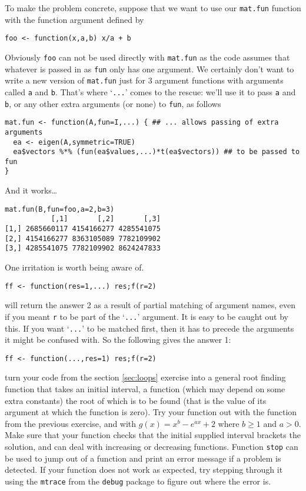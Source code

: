 \documentclass[10pt] {article}
\theoremstyle{definition}
\begin{document}
To make the problem concrete, suppose that we want to use our \lstinline$mat.fun$ function with the function argument defined by 
\begin{lstlisting}
foo <- function(x,a,b) x/a + b
\end{lstlisting}
Obviously {\tt foo} can not be used directly with \lstinline$mat.fun$ as the code assumes that whatever is passed in as {\tt fun} only has one argument. We certainly don't want to write a new version of \lstinline$mat.fun$ just for 3 argument functions with arguments called {\tt a} and {\tt b}. That's where `\lstinline$...$' comes to the rescue: we'll use it to pass {\tt a} and {\tt b}, or any other extra arguments (or none) to {\tt fun}, as follows
\begin{lstlisting}
mat.fun <- function(A,fun=I,...) { ## ... allows passing of extra arguments
  ea <- eigen(A,symmetric=TRUE)
  ea$vectors %*% (fun(ea$values,...)*t(ea$vectors)) ## to be passed to fun
}
\end{lstlisting}
And it works\ldots
\begin{lstlisting}
mat.fun(B,fun=foo,a=2,b=3)
           [,1]       [,2]       [,3]
[1,] 2685660117 4154166277 4285541075
[2,] 4154166277 8363105089 7782109902
[3,] 4285541075 7782109902 8624247833
\end{lstlisting}

One irritation is worth being aware of. 
\begin{lstlisting}
ff <- function(res=1,...) res;f(r=2)
\end{lstlisting}
will return the answer 2 as a result of partial matching of argument names, even if you meant \lstinline+r+ to be part of the `\lstinline+...+' argument. It is easy to be caught out by this. If you want `\lstinline+...+' to be matched first, then it has to precede the arguments it might be confused with. So the following gives the answer 1:
\begin{lstlisting}
ff <- function(...,res=1) res;f(r=2)
\end{lstlisting}

 turn your code from the section \ref{sec:loops} exercise into a general root finding function that takes an initial interval, a function (which may depend on some extra constants) the root of which is to be found (that is the value of its argument at which the function is zero). Try your function out with the function from the previous exercise, and with $g(x) = x^b - e^{ax} + 2$ where $b \ge 1$ and $a>0$. Make sure that your function checks that the initial supplied interval brackets the solution, and can deal with increasing or decreasing functions. Function {\tt stop} can be used to jump out of a function and print an error message if a problem is detected.  If your function does not work as expected, try stepping through it using the {\tt mtrace} from the {\tt debug} package to figure out where the error is.   
\end{document}
